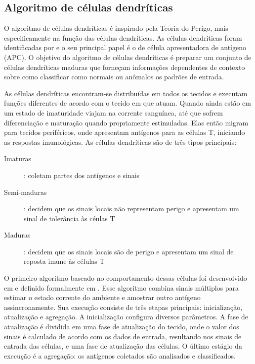 \subsection{Algoritmo de células dendríticas}

O algoritmo de células dendríticas é inspirado pela Teoria do Perigo, mais especificamente na função das células dendríticas. As células dendríticas foram identificadas por \citet{Steinman1973} e o seu principal papel é o de célula apresentadora de antígeno (APC). O objetivo do algoritmo de células dendríticas é preparar um conjunto de células dendríticas maduras que forneçam informações dependentes de contexto sobre como classificar como normais ou anômalos os padrões de entrada.

As células dendríticas encontram-se distribuídas em todos os tecidos e executam funções diferentes de acordo com o tecido em que atuam. Quando ainda estão em um estado de imaturidade viajam na corrente sanguínea, até que sofrem diferenciação e maturação quando propriamente estimuladas. Elas então migram para tecidos periféricos, onde apresentam antígenos para as células T, iniciando as respostas imunológicas. As células dendríticas são de três tipos principais:

\begin{description}
    \item[Imaturas]: coletam partes dos antígenos e sinais
    \item[Semi-maduras]: decidem que os sinais locais não representam perigo e apresentam um sinal de tolerância às céulas T
    \item[Maduras]: decidem que os sinais locais são de perigo e apresentam um sinal de reposta imune às células T
\end{description}

O primeiro algoritmo baseado no comportamento dessas células foi desenvolvido em \citet{Greensmith2005} e definido formalmente em \citet{Greensmith2006}. Esse algoritmo combina sinais múltiplos para estimar o estado corrente do ambiente e amostrar outro antígeno assincronamente. Sua execução consiste de três etapas principais: inicialização, atualização e agregação. A inicialização configura diversos parâmetros. A fase de atualização é dividida em uma fase de atualização do tecido, onde o valor dos sinais é calculado de acordo com os dados de entrada, resultando nos sinais de entrada das células, e uma fase de atualização das células. O último estágio da execução é a agregação: os antígenos coletados são analisados e classificados.

